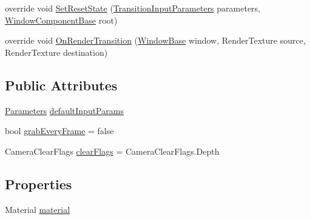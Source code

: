 \begin{DoxyCompactItemize}
\item 
override void \hyperlink{class_unity_engine_1_1_u_i_1_1_windows_1_1_animations_1_1_window_transition_basic_a8610065cf75c8660b7e477c58b73e42d}{Set\+Reset\+State} (\hyperlink{class_unity_engine_1_1_u_i_1_1_windows_1_1_animations_1_1_transition_input_parameters}{Transition\+Input\+Parameters} parameters, \hyperlink{class_unity_engine_1_1_u_i_1_1_windows_1_1_window_component_base}{Window\+Component\+Base} root)
\item 
override void \hyperlink{class_unity_engine_1_1_u_i_1_1_windows_1_1_animations_1_1_window_transition_basic_a79ae6f6dcdca3bc00887b04a58ad337e}{On\+Render\+Transition} (\hyperlink{class_unity_engine_1_1_u_i_1_1_windows_1_1_window_base}{Window\+Base} window, Render\+Texture source, Render\+Texture destination)
\end{DoxyCompactItemize}
\subsection*{Public Attributes}
\begin{DoxyCompactItemize}
\item 
\hyperlink{class_unity_engine_1_1_u_i_1_1_windows_1_1_animations_1_1_window_transition_basic_1_1_parameters}{Parameters} \hyperlink{class_unity_engine_1_1_u_i_1_1_windows_1_1_animations_1_1_window_transition_basic_a99dc598d847f0f0136d8f135654ed3ca}{default\+Input\+Params}
\item 
bool \hyperlink{class_unity_engine_1_1_u_i_1_1_windows_1_1_animations_1_1_window_transition_basic_ac3212a99fe0aa2c7a3568e64ec224347}{grab\+Every\+Frame} = false
\item 
Camera\+Clear\+Flags \hyperlink{class_unity_engine_1_1_u_i_1_1_windows_1_1_animations_1_1_window_transition_basic_a7a40a1aa1cd457887d8b1e58f82e2479}{clear\+Flags} = Camera\+Clear\+Flags.\+Depth
\end{DoxyCompactItemize}
\subsection*{Properties}
\begin{DoxyCompactItemize}
\item 
Material \hyperlink{class_unity_engine_1_1_u_i_1_1_windows_1_1_animations_1_1_window_transition_basic_a1e1577f4e66ec7ac3842a672e4b2d0e5}{material}
\end{DoxyCompactItemize}


